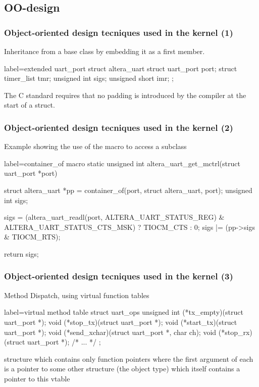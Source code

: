 \documentclass[xcolor=dvipsnames,compress]{beamer}
\begin{document}
\subsection*{OO-design}
\begin{frame}[fragile]
\frametitle{Object-oriented design tecniques used in the kernel (1)}
    Inheritance from a base class by embedding it as a first member.
    \begin{ccode*}{label=extended uart\_port} 
    struct altera_uart {
      struct uart_port port;
      struct timer_list tmr;
      unsigned int sigs;
      unsigned short imr;
    }; 
    \end{ccode*}
    The C standard requires that no padding is introduced by the compiler at the start of a struct.
\end{frame}
\begin{frame}[fragile]
\frametitle{Object-oriented design tecniques used in the kernel (2)}
    Example showing the use of the  macro to access a subclass
    \begin{ccode*}{label=container\_of macro}
    static unsigned int altera_uart_get_mctrl(struct uart_port *port)
    {
      struct altera_uart *pp = container_of(port, struct altera_uart, port);
      unsigned int sigs;

      sigs = (altera_uart_readl(port, ALTERA_UART_STATUS_REG) &
        ALTERA_UART_STATUS_CTS_MSK) ? TIOCM_CTS : 0;
      sigs |= (pp->sigs & TIOCM_RTS);

      return sigs;
    } 
    \end{ccode*}
\end{frame}
\begin{frame}[fragile]
\frametitle{Object-oriented design tecniques used in the kernel (3)}
    Method Dispatch, using virtual function tables
    \begin{ccode*}{label=virtual method table}
    struct uart_ops {
      unsigned int  (*tx_empty)(struct uart_port *);
      void          (*stop_tx)(struct uart_port *);
      void          (*start_tx)(struct uart_port *);
      void          (*send_xchar)(struct uart_port *, char ch);
      void          (*stop_rx)(struct uart_port *);
    /* ... */
    };
    \end{ccode*}
structure which contains only function pointers where the first argument of each is
a pointer to some other structure (the object type) which itself contains a pointer to this vtable
\end{frame}
\end{document}
